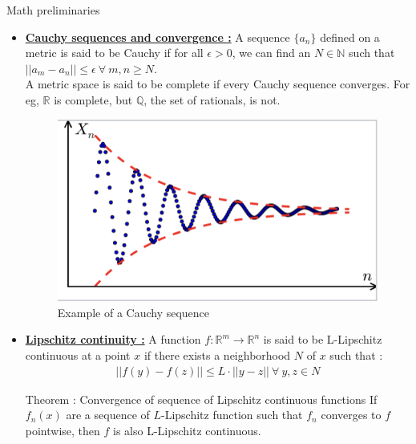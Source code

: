 \documentclass[8pt,aspectratio=169]{beamer}
\begin{document}
\begin{frame}{Math preliminaries}
    \begin{itemize}
        \item \textbf{\underline{Cauchy sequences and convergence :}} A sequence $\{a_n\}$ defined on a metric is said to be Cauchy if for all $\epsilon > 0$, we can find an $N \in \mathbb{N}$ such that $||a_m - a_n|| \leq \epsilon \ \forall \ m,n \geq N$. \\

        A metric space is said to be complete if every Cauchy sequence converges. For eg, $\mathbb{R}$ is complete, but $\mathbb{Q}$, the set of rationals, is not.

        \begin{figure}[h]
            \centering
            \includegraphics[width=0.2\linewidth]{cauchy_seq.png}
            \caption{Example of a Cauchy sequence}
            \label{fig:enter-label}
        \end{figure}

        \item \textbf{\underline{Lipschitz continuity :}} A function $f : \mathbb{R}^m \to \mathbb{R}^n$ is said to be L-Lipschitz continuous at a point $x$ if there exists a neighborhood $N$ of $x$ such that :
            \begin{align*}
                ||f(y) - f(z)|| \leq L\cdot ||y-z|| \ \forall \ y, z \in N
            \end{align*}

        \begin{block}{Theorem : Convergence of sequence of Lipschitz continuous functions}
        If $f_n(x)$ are a sequence of $L$-Lipschitz function such that $f_n$ converges to $f$ pointwise, then $f$ is also L-Lipschitz continuous.
    \end{block}
    \end{itemize}    
\end{frame}
\end{document}
